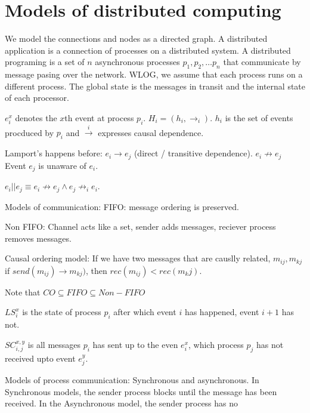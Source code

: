 \documentclass[11pt]{book}
\begin{document}
\section{Models of distributed computing}
We model the connections and nodes as a directed graph. A distributed application
is a connection of processes on a distributed system. A distributed programing
is a set of $n$ asynchronous processes $p_1, p_2, \dots p_n$ that communicate
by message pasing over the network. WLOG, we assume that each process runs
on a different process. The global state is the messages in transit and the
internal state of each processor.

$e_i^x$ denotes the $x$th event at process $p_i$.  $H_i = (h_i, \rightarrow_i)$.
$h_i$ is the set of events procduced by $p_i$ and $\xrightarrow{i}$ expresses
causal dependence.

Lamport's happens before: $e_i \rightarrow e_j$ (direct / transitive dependence).
$e_i \not \rightarrow e_j$ Event $e_j$ is unaware of $e_i$.

$e_i || e_j \equiv e_i \not \rightarrow e_j \land e_j \not \rightarrow_i e_i$.


Models of communication: FIFO: message ordering is preserved.

Non FIFO: Channel acts like a set, sender adds messages, reciever process removes
messages.


Causal ordering model: If we have two messages that are causlly related, 
$m_{ij}, m_{kj}$ if $send(m_{ij}) \rightarrow m_{kj})$, then $rec(m_{ij}) < rec(m_kj)$.

Note that $CO \subseteq FIFO \subseteq Non-FIFO$

$LS_i^x$ is the state of process $p_i$ after which event $i$ has happened, event $i + 1$ has not.

$SC_{i, j}^{x, y}$ is all messages $p_i$ has sent up to the even $e_i^x$, which
process $p_j$ has not received upto event $e^y_j$.

Models of process communication: Synchronous and asynchronous.
In Synchronous models, the sender process blocks until the message has been received.
In the Asynchronous model, the sender process has no 
\end{document}
